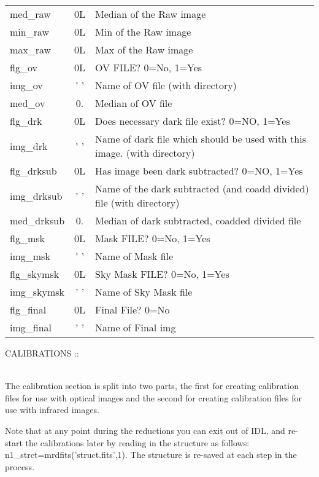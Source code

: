 \documentclass[11pt,letterpaper,dvips]{article}
\begin{document}
\begin{enumerate}
\begin{Aenumerate}
{\begin{tabular}{lcl}
          med\_raw & 0L &      Median of the Raw image \\
          min\_raw & 0L &      Min of the Raw image \\
          max\_raw & 0L &      Max of the Raw image \\
          flg\_ov &  0L &       OV FILE?  0=No, 1=Yes   \\
          img\_ov &  ' ' &     Name of OV file (with directory) \\
          med\_ov &  0. &      Median of OV file \\
          flg\_drk & 0L &        Does necessary dark file exist? 0=NO, 1=Yes \\
          img\_drk & ' ' &     Name of dark file which should be used with this image. (with directory) \\
          flg\_drksub & 0L &    Has image been dark subtracted? 0=NO, 1=Yes \\
          img\_drksub & ' ' &  Name of the dark subtracted (and coadd divided) file (with directory) \\
          med\_drksub & 0. &   Median of dark subtracted, coadded divided file \\
          flg\_msk &  0L &      Mask FILE?  0=No, 1=Yes   \\
          img\_msk &  ' ' &    Name of Mask file \\
          flg\_skymsk &   0L &  Sky Mask FILE?  0=No, 1=Yes   \\
          img\_skymsk &  ' ' & Name of Sky Mask file \\
          flg\_final & 0L &     Final File? 0=No \\
          img\_final & ' ' &  Name of Final img \\
	  \hline
	\end{tabular}
	}

  \end{Aenumerate}

  \clearpage

  {\Large  \item CALIBRATIONS :: } \\
  The calibration section is split into two parts, the
  first for creating calibration files for use with optical images and
  the second for creating calibration files for use with infrared
  images.
  
  Note that at any point during the reductions you can exit out of
  IDL, and re-start the calibrations later by reading in the structure
  as follows: n1\_strct=mrdfits('struct.fits',1).  The structure is
  re-saved at each step in the process.



\end{enumerate}
\end{document}
